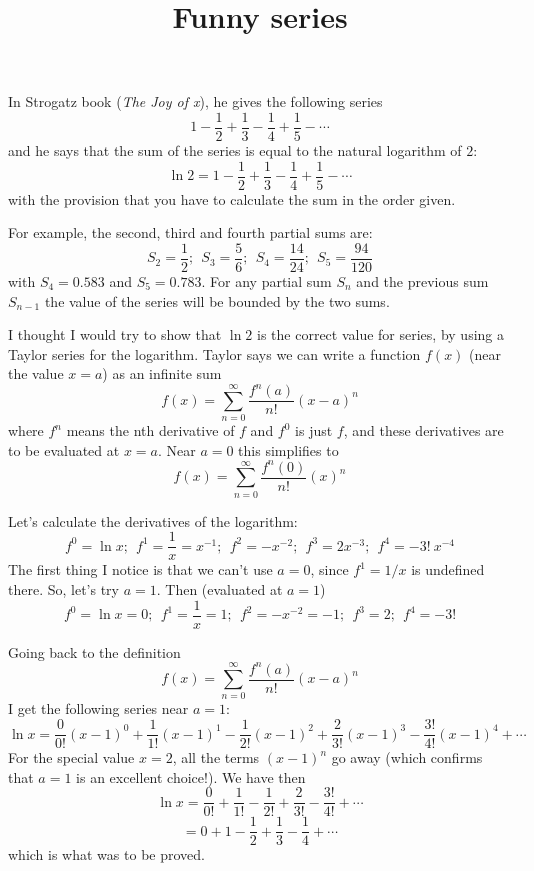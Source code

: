 \documentclass[11pt, oneside]{article}   	%
\title{Funny series}
\date{}							%
\begin{document}
\maketitle
\Large
\noindent
In Strogatz book (\emph{The Joy of x}), he gives the following series
\[ 1 - \frac{1}{2} + \frac{1}{3} - \frac{1}{4} + \frac{1}{5} - \cdots \]
and he says that the sum of the series is equal to the natural logarithm of $2$:
\[ \ln 2 = 1 - \frac{1}{2} + \frac{1}{3} - \frac{1}{4} + \frac{1}{5} - \cdots \]
with the provision that you have to calculate the sum in the order given.

For example, the second, third and fourth partial sums are:
\[ S_2 = \frac{1}{2} ; \ \  S_3 = \frac{5}{6}; \ \ S_4 = \frac{14}{24}; \ \ S_5 = \frac{94}{120} \]
with $S_4 = 0.583$ and $S_5 = 0.783$.  For any partial sum $S_n$ and the previous sum $S_{n-1}$ the value of the series will be bounded by the two sums.

I thought I would try to show that $\ln 2$ is the correct value for series, by using a Taylor series for the logarithm.  Taylor says we can write a function $f(x)$ (near the value $x=a$) as an infinite sum
\[ f(x) = \sum_{n=0}^\infty \frac{f^n(a)}{n!} (x-a)^n\]
where $f^n$ means the nth derivative of $f$ and $f^0$ is just $f$, and these derivatives are to be evaluated at $x=a$.
Near $a=0$ this simplifies to 
\[ f(x) = \sum_{n=0}^\infty \frac{f^n(0)}{n!} (x)^n\]

Let's calculate the derivatives of the logarithm:
\[ f^0 = \ln x; \ \ f^1 = \frac{1}{x} = x^{-1}; \ \ f^2 = -x^{-2}; \ \ f^3 = 2x^{-3}; \ \ f^4 = -3!\ x^{-4}  \]
The first thing I notice is that we can't use $a=0$, since $f^1 = 1/x$ is undefined there.  So, let's try $a=1$.  Then (evaluated at $a=1$)
\[ f^0 = \ln x = 0; \ \ f^1 = \frac{1}{x} = 1; \ \ f^2 = -x^{-2} = -1; \ \ f^3 = 2; \ \ f^4 = -3!  \]

Going back to the definition
\[ f(x) = \sum_{n=0}^\infty \frac{f^n(a)}{n!} (x-a)^n\]
I get the following series near $a = 1$:
\[ \ln x = \frac{0}{0!} (x-1)^0 +  \frac{1}{1!} (x-1)^1 - \frac{1}{2!} (x-1)^2 + \frac{2}{3!} (x-1)^3 - \frac{3!}{4!} (x-1)^4 + \cdots \]
For the special value $x=2$, all the terms $(x-1)^n$ go away (which confirms that $a=1$ is an excellent choice!).  We have then
\[ \ln x = \frac{0}{0!} +  \frac{1}{1!} - \frac{1}{2!} + \frac{2}{3!} - \frac{3!}{4!} + \cdots \]
\[ =  0 + 1 - \frac{1}{2} + \frac{1}{3} - \frac{1}{4} + \cdots \]
which is what was to be proved.
\end{document}
